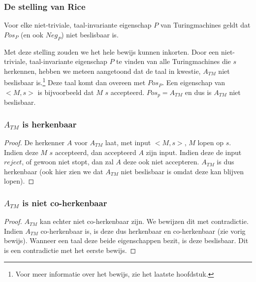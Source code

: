 \subsubsection*{De stelling van Rice}

\begin{theorem}
	Voor elke niet-triviale, taal-invariante eigenschap $P$ van Turingmachines geldt dat $Pos_P$ (en ook $Neg_P$) niet beslisbaar is.
\end{theorem}

Met deze stelling zouden we het hele bewijs kunnen inkorten. Door een niet-triviale, taal-invariante eigenschap $P$ te vinden van alle Turingmachines die $s$ herkennen, hebben we meteen aangetoond dat de taal in kwestie, $A_{TM}$ niet beslisbaar is.\footnote{Voor meer informatie over het bewijs, zie het laatste hoofdstuk.} Deze taal komt dan overeen met $Pos_P$. Een eigenschap van $<M,s>$ is bijvoorbeeld dat $M$ $s$ accepteerd. $Pos_p = A_{TM}$ en dus is $A_{TM}$ niet beslisbaar.

\subsubsection*{$A_{TM}$ is herkenbaar}
\begin{proof}
	De herkenner $A$ voor $A_{TM}$ laat, met input $<M,s>$, $M$ lopen op $s$. Indien deze $M$ $s$ accepteerd, dan accepteerd $A$ zijn input. Indien deze de input $reject$, of gewoon niet stopt, dan zal $A$ deze ook niet accepteren. $A_{TM}$ is dus herkenbaar (ook hier zien we dat $A_{TM}$ niet beslisbaar is omdat deze kan blijven lopen).
\end{proof}

\subsubsection*{$A_{TM}$ is niet co-herkenbaar}
\begin{proof}
	$A_{TM}$ kan echter niet co-herkenbaar zijn. We bewijzen dit met contradictie. Indien $A_{TM}$ co-herkenbaar is, is deze dus herkenbaar en co-herkenbaar (zie vorig bewijs). Wanneer een taal deze beide eigenschappen bezit, is deze beslisbaar. Dit is een contradictie met het eerste bewijs.
\end{proof}
